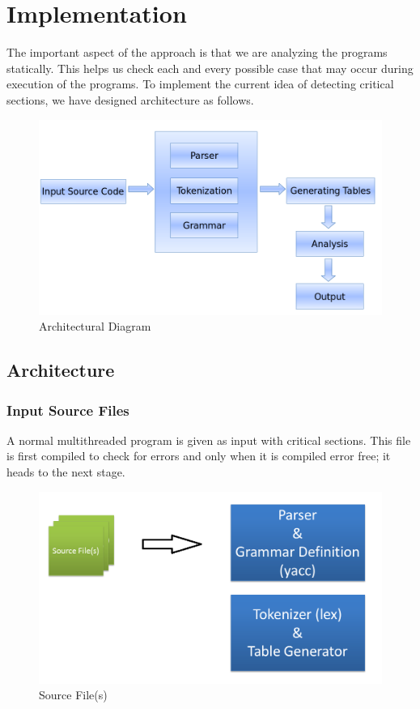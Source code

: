 \chapter{Implementation}

The important aspect of the approach is that we are analyzing the programs statically. This helps us check each and every possible case that may occur during execution of the programs. To implement the current idea of detecting critical sections, we have designed architecture as follows.


\begin{figure}[H]
\centering
\includegraphics[scale=0.4]{architecture.png}
\caption{Architectural Diagram}
\label{<<Label>>}
\end{figure}
\newpage
\section{Architecture}

\subsection{Input Source Files}
A normal multithreaded program is given as input with critical sections. This file is first compiled to check for errors and only when it is compiled error free; it heads to the next stage.

\begin{figure}[H]
\centering
\includegraphics[scale=0.5]{input.png}
\caption{Source File(s)}
\label{<<Label>>}
\end{figure}


